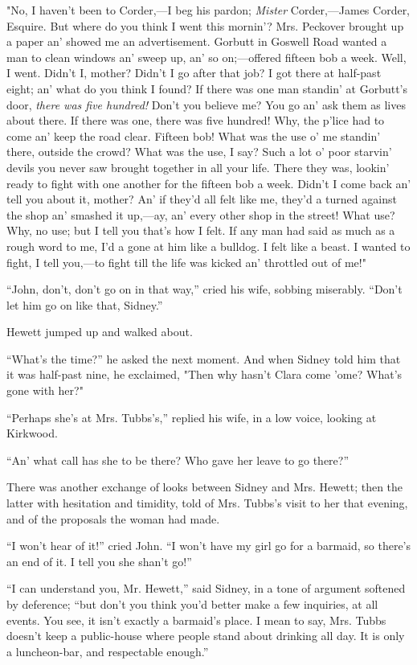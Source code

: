 "No, I haven't been to Corder,---I beg his pardon; \emph{Mister}
Corder,---James Corder, Esquire. But where do you think I went this
mornin'? Mrs. Peckover brought up a paper an' showed me an
advertisement. Gorbutt in Goswell Road wanted a man to clean windows an'
sweep up, an' so on;---offered fifteen bob a week. Well, I went. Didn't
I, mother? Didn't I go after that job? I got there at half-past eight;
an' what do you think I found? If there was one man standin' at
Gorbutt's door, \emph{there was five hundred!} Don't you believe me? You
go an' ask them as lives about there. If there was one, there was five
hundred! Why, the p'lice had to come an' keep the {}road clear. Fifteen
bob! What was the use o' me standin' there, outside the crowd? What was
the use, I say? Such a lot o' poor starvin' devils you never saw brought
together in all your life. There they was, lookin' ready to fight with
one another for the fifteen bob a week. Didn't I come back an' tell you
about it, mother? An' if they'd all felt like me, they'd a turned
against the shop an' smashed it up,---ay, an' every other shop in the
street! What use? Why, no use; but I tell you that's how I felt. If any
man had said as much as a rough word to me, I'd a gone at him like a
bulldog. I felt like a beast. I wanted to fight, I tell you,---to fight
till the life was kicked an' throttled out of me!"

``John, don't, don't go on in that way,'' cried his wife, sobbing
miserably. ``Don't let him go on like that, Sidney.''

Hewett jumped up and walked about.

``What's the time?'' he asked the next moment. And when Sidney told him
that it was half-past nine, he exclaimed, "Then {}why hasn't Clara come
'ome? What's gone with her?"

``Perhaps she's at Mrs. Tubbs's,'' replied his wife, in a low voice,
looking at Kirkwood.

``An' what call has she to be there? Who gave her leave to go there?''

There was another exchange of looks between Sidney and Mrs. Hewett; then
the latter with hesitation and timidity, told of Mrs. Tubbs's visit to
her that evening, and of the proposals the woman had made.

``I won't hear of it!'' cried John. ``I won't have my girl go for a
barmaid, so there's an end of it. I tell you she shan't go!''

``I can understand you, Mr. Hewett,'' said Sidney, in a tone of argument
softened by deference; ``but don't you think you'd better make a few
inquiries, at all events. You see, it isn't exactly a barmaid's place. I
mean to say, Mrs. Tubbs doesn't keep a public-house where people stand
about drinking all day. It is only a luncheon-bar, and respectable
enough.''

